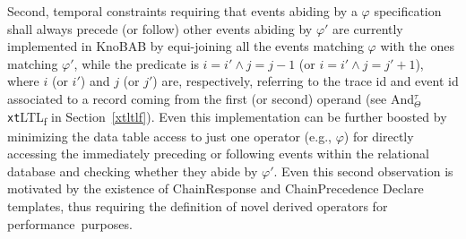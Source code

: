 \documentclass[information,article,accept,pdftex,oneauthor]{Definitions/mdpi}
\begin{document}
{{Second},} %
 temporal constraints requiring that events abiding by a $\varphi$ specification shall always precede (or follow) other events abiding by $\varphi'$ are currently implemented in KnoBAB by equi-joining all the events matching  $\varphi$ with the ones matching $\varphi'$, while the predicate is $i=i' \wedge j=j-1$ (or $i=i' \wedge j=j'+1$), where $i$ (or $i'$) and $j$ (or $j'$) are, respectively, referring to the trace id and event id associated to a record coming from the first (or second) operand (see \textsf{And}$^\tau_\Theta$ \texttt{xt}LTL\textsubscript{f} in Section~\ref{xtltlf}). Even this implementation can be further boosted by minimizing the data table access to just one operator (e.g., $\varphi$) for directly accessing the immediately preceding or following events within the relational database and checking whether they abide by $\varphi'$. Even this second observation is motivated by the existence of \textsf{ChainResponse} and \textsf{ChainPrecedence} Declare templates, thus requiring the definition of novel derived operators for performance~purposes.


\end{document}
